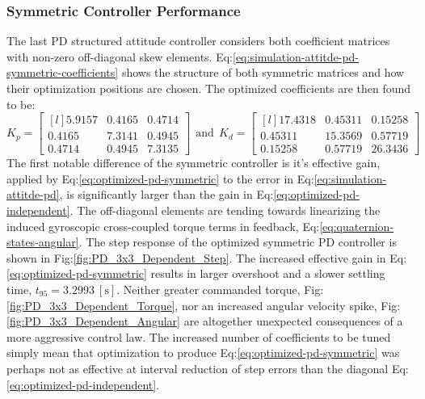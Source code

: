 \subsubsection{Symmetric Controller Performance}
\label{subsubsec:simulation.atttiude.pd.3x3}
The last PD structured attitude controller considers both coefficient matrices with non-zero off-diagonal skew elements. Eq:\ref{eq:simulation-attitde-pd-symmetric-coefficients} shows the structure of both symmetric matrices and how their optimization positions are chosen. The optimized coefficients are then found to be:
\begin{equation}\label{eq:optimized-pd-symmetric}
K_p = \begin{bmatrix*}[l]
5.9157 & 0.4165 & 0.4714\\
0.4165 & 7.3141 & 0.4945\\
0.4714 & 0.4945 & 7.3135
\end{bmatrix*}
~~\text{and}~~K_d = \begin{bmatrix*}[l]
17.4318 & 0.45311 & 0.15258\\
0.45311 & 15.3569 & 0.57719\\
0.15258 & 0.57719 & 26.3436
\end{bmatrix*}
\end{equation}
The first notable difference of the symmetric controller is it's effective gain, applied by Eq:\ref{eq:optimized-pd-symmetric} to the error in Eq:\ref{eq:simulation-attitde-pd}, is significantly larger than the gain in Eq:\ref{eq:optimized-pd-independent}. The off-diagonal elements are tending towards linearizing the induced gyroscopic cross-coupled torque terms in feedback, Eq:\ref{eq:quaternion-states-angular}. The step response of the optimized symmetric PD controller is shown in Fig:\ref{fig:PD_3x3_Dependent_Step}. The increased effective gain in Eq:\ref{eq:optimized-pd-symmetric} results in larger overshoot and a slower settling time, $t_{95}=3.2993~[\text{s}]$. Neither greater commanded torque, Fig:\ref{fig:PD_3x3_Dependent_Torque}, nor an increased angular velocity spike, Fig:\ref{fig:PD_3x3_Dependent_Angular} are altogether unexpected consequences of a more aggressive control law. The increased number of coefficients to be tuned simply mean that optimization to produce Eq:\ref{eq:optimized-pd-symmetric} was perhaps not as effective at interval reduction of step errors than the diagonal Eq:\ref{eq:optimized-pd-independent}.
\newpage
